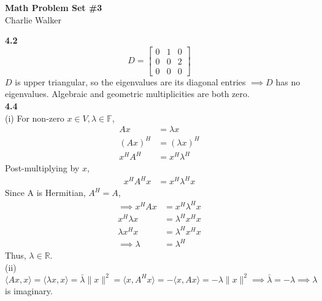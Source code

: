 \documentclass[letterpaper,12pt]{article}
\theoremstyle{definition}
\begin{document}
\begin{flushleft}
  \textbf{\large{Math Problem Set \#3}} \\
  Charlie Walker
\end{flushleft}

\vspace{5mm}

\noindent\textbf{4.2}\\
\begin{equation*}
D= \begin{bmatrix}
	0 & 1 & 0\\
	0 & 0 & 2\\
	0 & 0 & 0
\end{bmatrix}
\end{equation*}
$D$ is upper triangular, so the eigenvalues are its diagonal entries $\implies D$ has no eigenvalues. Algebraic and geometric multiplicities are both zero.\\

\noindent\textbf{4.4}\\
(i) For non-zero $x \in V, \lambda \in \mathbb{F}$,
\begin{align*}
Ax &= \lambda x\\
(Ax)^H &= (\lambda x)^H\\
x^HA^H &= x^H\lambda ^H
\end{align*}
Post-multiplying by $x$,
\begin{align*}
x^HA^Hx &= x^H\lambda^Hx
\end{align*}
Since A is Hermitian, $A^H = A$,
\begin{align*}
\implies x^HAx &= x^H\lambda^Hx\\
x^H\lambda x &= \lambda^H x^Hx\\
\lambda x^H x &= \lambda^H x^H x\\
\implies \lambda &= \lambda^H
\end{align*}
Thus, $\lambda \in \mathbb{R}$.\\

(ii) $\langle Ax, x \rangle = \langle \lambda x, x \rangle = \bar{\lambda} \|x\|^2 = \langle x, A^H x \rangle = - \langle x, Ax \rangle = -\lambda \|x\|^2 \implies \bar{\lambda} = -\lambda \implies \lambda$ is imaginary. \\
\end{document}
